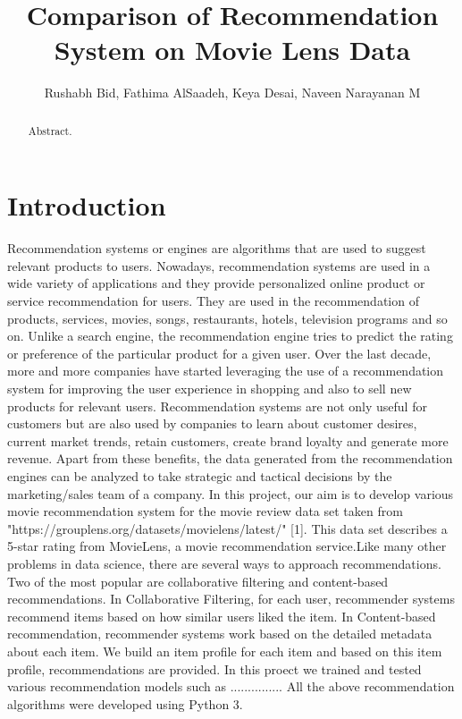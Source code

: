 \documentclass[sigconf]{acmart}
\begin{document}
\title{Comparison of Recommendation System on Movie Lens Data}

\author{Rushabh Bid, Fathima AlSaadeh, Keya Desai, Naveen Narayanan M}

\begin{abstract}
Abstract.
\end{abstract}


\maketitle

\section{Introduction}
Recommendation systems or engines are algorithms that are used to suggest relevant products to users. Nowadays, recommendation systems are used in a wide variety of applications and they provide personalized online product or service recommendation for users. They are used in the recommendation of products, services, movies, songs, restaurants, hotels, television programs and so on. Unlike a search engine, the recommendation engine tries to predict the rating or preference of the particular product for a given user. Over the last decade, more and more companies have started leveraging the use of a recommendation system for improving the user experience in shopping and also to sell new products for relevant users. Recommendation systems are not only useful for customers but are also used by companies to learn about customer desires, current market trends, retain customers, create brand loyalty and generate more revenue. Apart from these benefits, the data generated from the recommendation engines can be analyzed to take strategic and tactical decisions by the marketing/sales team of a company. In this project, our aim is to develop various movie recommendation system for the movie review data set taken from "https://grouplens.org/datasets/movielens/latest/" [1]. This data set describes a 5-star rating from MovieLens, a movie recommendation service.Like many other problems in data science, there are several ways to approach
recommendations. Two of the most popular are collaborative filtering and content-based recommendations. In Collaborative Filtering,
for each user, recommender systems recommend items based on how similar users liked the item. In Content-based recommendation,
recommender systems work based on the detailed metadata about each item. We build an item profile for each item and based on this item profile, recommendations are provided. In this proect we trained and tested various recommendation models such as ............... All the above recommendation algorithms were developed using Python 3. 
\end{document}
